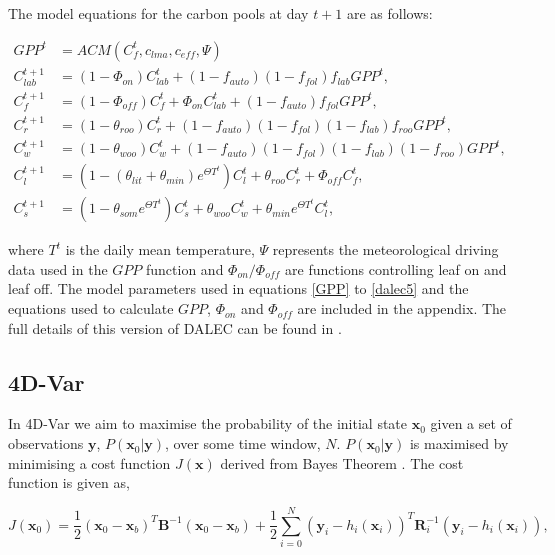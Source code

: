 \documentclass[11pt]{article}
\begin{document}
The model equations for the carbon pools at day $t+1$ are as follows:

\begin{align}
GPP^{t} &= ACM(C_f^{t}, c_{lma}, c_{eff}, \Psi) \label{GPP}
\\C_{lab}^{t+1}&=(1-\Phi _{on})C_{lab}^{t}+(1-f_{auto})(1-f_{fol})f_{lab}GPP^{t}, \label{daleclab}
\\C_f^{t+1}&=(1-\Phi_{off})C_f^{t}+\Phi_{on}C_{lab}^{t}+(1-f_{auto})f_{fol}GPP^{t}, \label{dalec1}
\\C_r^{t+1}&=(1-\theta_{roo})C_r^{t}+(1-f_{auto})(1-f_{fol})(1-f_{lab})f_{roo}GPP^{t}, 
\\C_w^{t+1}&=(1-\theta_{woo})C_w^{t}+(1-f_{auto})(1-f_{fol})(1-f_{lab})(1-f_{roo})GPP^{t}, 
\\C_l^{t+1}&=(1-(\theta_{lit}+\theta_{min})e^{\Theta T^{t}})C_l^{t}+\theta_{roo}C_r^{t}+\Phi_{off}C_f^{t}, 
\\C_s^{t+1}&=(1-\theta_{som}e^{\Theta T^{t}})C_s^{t}+\theta_{woo}C_w^{t}+\theta_{min}e^{\Theta T^{t}}C_l^{t}, \label{dalec5}
\end{align}

where $T^{t}$ is the daily mean temperature, $\Psi$ represents the meteorological driving data used in the $GPP$ function and $\Phi_{on} / \Phi_{off}$ are functions controlling leaf on and leaf off. The model parameters used in equations \ref{GPP} to \ref{dalec5} and the equations used to calculate $GPP$, $\Phi_{on}$ and $\Phi_{off}$ are included in the appendix. The full details of this version of DALEC can be found in \cite{Bloom2015}.

\subsection{4D-Var} \label{4dvar}

In 4D-Var we aim to maximise the probability of the initial state $\textbf{x}_0$ given a set of observations $\textbf{y}$, $P(\textbf{x}_0|\textbf{y})$, over some time window, $N$. $P(\textbf{x}_0|\textbf{y})$ is maximised by minimising a cost function $J(\textbf{x})$ derived from Bayes Theorem \citep{lewis2006dynamic}. The cost function is given as,

\begin{equation}
J(\textbf{x}_0) = \frac{1}{2}(\textbf{x}_0-\textbf{x}_b)^{T}\textbf{B}^{-1}(\textbf{x}_0-\textbf{x}_b)+\frac{1}{2}\sum_{i=0}^{N}(\textbf{y}_i-h_i(\textbf{x}_i))^{T}\textbf{R}_{i}^{-1}(\textbf{y}_i-h_i(\textbf{x}_i)),
\end{equation}
\end{document}
